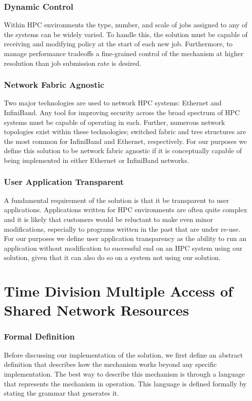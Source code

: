 \documentclass[oneside,12pt]{memoir}
\begin{document}
\subsection{Dynamic Control}
Within HPC environments the type, number, and scale of jobs assigned to any of the systems can be widely varied. To handle this, the solution must be capable of receiving and modifying policy at the start of each new job. Furthermore, to manage performance tradeoffs a fine-grained control of the mechanism at higher resolution than job submission rate is desired. 
\subsection{Network Fabric Agnostic}
Two major technologies are used to network HPC systems: Ethernet and InfiniBand. Any tool for improving security across the broad spectrum of HPC systems must be capable of operating in each. Further, numerous network topologies exist within these technologies; switched fabric and tree structures are the most common for InfiniBand and Ethernet, respectively. For our purposes we define this solution to be network fabric agnostic if it is conceptually capable of being implemented in either Ethernet or InfiniBand networks. 
\subsection{User Application Transparent}
A fundamental requirement of the solution is that it be transparent to user applications. Applications written for HPC environments are often quite complex and it is likely that customers would be reluctant to make even minor modifications, especially to programs written in the past that are under re-use. For our purposes we define user application transparency as the ability to run an application without modification to successful end on an HPC system using our solution, given that it can also do so on a system not using our solution. 
\chapter{Time Division Multiple Access of Shared Network Resources}

\subsection{Formal Definition}
\label{sec:formal_definition}
Before discussing our implementation of the solution, we first define an abstract definition that describes how the mechanism works beyond any specific implementation. The best way to describe this mechanism is through a language that represents the mechanism in operation. This language is defined formally by stating the grammar that generates it.
\end{document}
